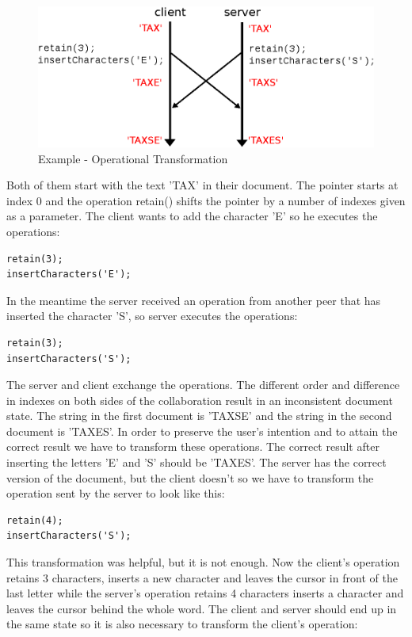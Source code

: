 \documentclass[12pt,oneside]{fithesis2}
\begin{document}
\begin{figure}[H]
\caption{Example - Operational Transformation}
\label{fig:ot}
\centering
\vspace{5mm}
\includegraphics{op1}
\end{figure}
Both of them start with the text 'TAX' in their document. The pointer starts at index 0 and the operation retain() shifts the pointer by a number of indexes given as a parameter. The client wants to add the character 'E' so he executes the operations:
\vspace{3mm}
\begin{verbatim}
retain(3);
insertCharacters('E');
\end{verbatim} 
\vspace{3mm}
In the meantime the server received an operation from another peer that has inserted the character 'S', so server executes the operations:
\vspace{3mm} 
\begin{verbatim}
retain(3);
insertCharacters('S');
\end{verbatim}
\vspace{3mm}
The server and client exchange the operations. The different order and difference in indexes on both sides of the collaboration result in an inconsistent document state. The string in the first document is 'TAXSE' and the string in the second document is 'TAXES'.  In order to preserve the user's intention and to attain the correct result we have to transform these operations. The correct result after inserting the letters 'E' and 'S' should be 'TAXES'. The server has the correct version of the document, but the client doesn't so we have to transform the operation sent by the server to look like this:
\vspace{3mm}
\begin{verbatim}
retain(4);
insertCharacters('S');
\end{verbatim}
\vspace{3mm}
This transformation was helpful, but it is not enough. Now the client's operation retains 3 characters, inserts a new character and leaves the cursor in front of the last letter while the server's operation retains 4 characters inserts a character and leaves the cursor behind the whole word. The client and server should end up in the same state so it is also necessary to transform the client's operation: 
\end{document}
